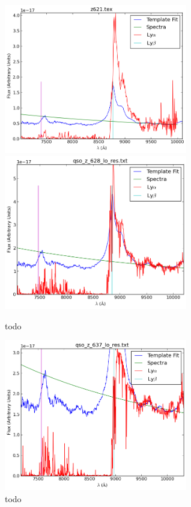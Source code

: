 \documentclass[11pt]{article}
\begin{document}
\begin{figure}[h]
  \includegraphics[width=8cm]{z621.png}
  \includegraphics[width=8cm]{qso_z_628_lo_res.png}
  \caption{todo}
  \label{fig:todo}
\end{figure}

\begin{figure}[h]
  \centering
  \includegraphics[width=8cm]{qso_z_637_lo_res.png}
  \caption{todo}
  \label{fig:todo}
\end{figure}
\end{document}
